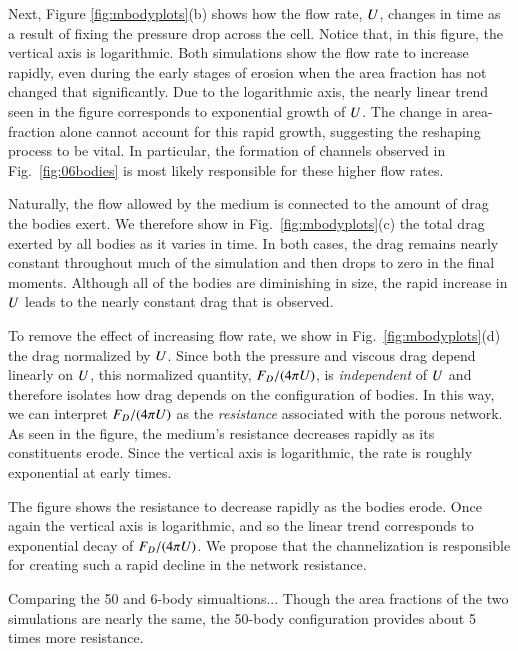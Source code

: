 \documentclass[preprint, 10pt]{elsarticle}
\begin{document}
Next, Figure \ref{fig:mbodyplots}(b) shows how the flow rate, $U$, changes in time as a result of fixing the pressure drop across the cell. Notice that, in this figure, the vertical axis is logarithmic. Both simulations show the flow rate to increase rapidly, even during the early stages of erosion when the area fraction has not changed that significantly. Due to the logarithmic axis, the nearly linear trend seen in the figure corresponds to exponential growth of $U$. The change in area-fraction alone cannot account for this rapid growth, suggesting the reshaping process to be vital. In particular, the formation of channels observed in Fig.~\ref{fig:06bodies} is most likely responsible for these higher flow rates.

Naturally, the flow allowed by the medium is connected to the amount of drag the bodies exert. We therefore show in Fig.~\ref{fig:mbodyplots}(c) the total drag exerted by all bodies as it varies in time. In both cases, the drag remains nearly constant throughout much of the simulation and then drops to zero in the final moments. Although all of the bodies are diminishing in size, the rapid increase in $U$ leads to the nearly constant drag that is observed.

To remove the effect of increasing flow rate, we show in Fig.~\ref{fig:mbodyplots}(d) the drag normalized by $U$. Since both the pressure and viscous drag depend linearly on $U$, this normalized quantity, $F_D / (4 \pi U)$, is {\em independent} of $U$ and therefore isolates how drag depends on the configuration of bodies. In this way, we can interpret $F_D / (4 \pi U)$ as the {\em resistance} associated with the porous network. As seen in the figure, the medium's resistance decreases rapidly as its constituents erode. Since the vertical axis is logarithmic, the rate is roughly exponential at early times. 

%
The figure shows the resistance to decrease rapidly as the bodies erode. Once again the vertical axis is logarithmic, and so the linear trend corresponds to exponential decay of $F_D / (4 \pi U)$. We propose that the channelization is responsible for creating such a rapid decline in the network resistance.




Comparing the 50 and 6-body simualtions...
Though the area fractions of the two simulations are nearly the same, the 50-body configuration provides about 5 times more resistance.
\end{document}
